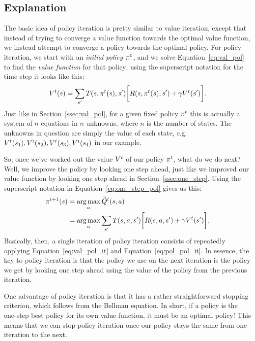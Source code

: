 \documentclass[a4paper]{article}
\begin{document}
\subsection{Explanation}
The basic idea of policy iteration is pretty similar to value iteration,
except that instead of trying to converge a value function towards the
optimal value function, we instead attempt to converge a policy towards
the optimal policy.
For policy iteration, we start with an \emph{initial policy} $\pi^0$,
and we solve Equation~\ref{eq:val_pol} to find the \emph{value function}
for that policy;
using the superscript notation for the time step it looks like this:
\begin{equation} \label{eq:val_pol_it}
  V^t(s) = \sum_{s'} T(s, \pi^t(s), s') \bigg[ R(s, \pi^t(s), s') + \gamma V^t(s') \bigg] .
\end{equation}
Just like in Section~\ref{ssec:val_pol}, for a given fixed policy $\pi^t$
this is actually a system of $n$ equations in $n$ unknowns, where $n$
is the number of states.
The unknowns in question are simply the value of each state, e.g.
$V^t(s_1), V^t(s_2), V^t(s_3), V^t(s_4)$ in our example.

So, once we've worked out the value $V^t$ of our policy $\pi^t$, what do we do next?
Well, we improve the policy by looking one step ahead, just like we improved our
value function by looking one step ahead in Section~\ref{ssec:one_step}.
Using the superscript notation in Equation~\ref{eq:one_step_pol} gives us this:
\begin{align}
  \pi^{t+1}(s) &= \operatorname*{arg\,max}_a \widetilde{Q}^t(s, a) \nonumber \\
                &= \operatorname*{arg\,max}_a \sum_{s'} T(s, a, s') \bigg[ R(s, a, s') + \gamma V^t(s') \bigg] . \label{eq:pol_pol_it}
\end{align}
Basically, then, a single iteration of policy iteration consists of repeatedly
applying Equation~\ref{eq:val_pol_it} and Equation~\ref{eq:pol_pol_it}.
In essence, the key to policy iteration is that the policy we use on the next
iteration is the policy we get by looking one step ahead using the value of the
policy from the previous iteration.

One advantage of policy iteration is that it has a rather straightforward
stopping criterion, which follows from the Bellman equation.
In short, if a policy is the one-step best policy for its own value function,
it must be an optimal policy!
This means that we can stop policy iteration once our policy stays the same
from one iteration to the next.
\end{document}
